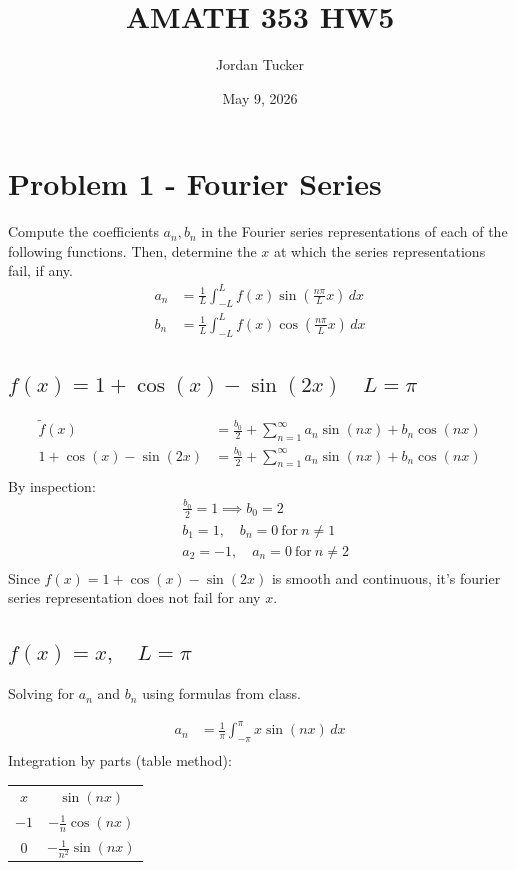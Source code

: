 \documentclass[11pt]{article}
\title{AMATH 353 HW5}
\author{Jordan Tucker}
\date{May 9, 2026}
\begin{document}
    \section*{Problem 1 - Fourier Series}
    Compute the coefficients $a_n,b_n$ in the Fourier series representations of each of the
    following functions.
    Then, determine the $x$ at which the series representations fail, if any.
    \begin{align*}
        a_n &= \frac{1}{L} \int_{-L}^{L} f(x) \sin(\frac{n \pi}{L} x) \,dx \\
        b_n &= \frac{1}{L} \int_{-L}^{L} f(x) \cos(\frac{n \pi}{L} x) \,dx
    \end{align*}

    \subsection{$f(x)=1+\cos(x) - \sin(2x) \quad L = \pi$}
    \begin{align*}
        \tilde f(x) &= \frac{b_0}{2} + \sum_{n=1}^\infty a_n \sin(nx) + b_n \cos(nx)\\
        1+\cos(x) - \sin(2x) &= \frac{b_0}{2} + \sum_{n=1}^\infty a_n \sin(nx) + b_n \cos(nx)\\
    \end{align*}
    By inspection:
    \begin{align*}
        &\frac{b_0}{2} = 1 \implies {b_0 = 2}\\
        &b_1 = 1, \quad b_n = 0 \ \text{for} \ n \neq 1\\
        &a_2 = -1, \quad a_n = 0 \ \text{for} \ n \neq 2\\
    \end{align*}
    Since $f(x)=1+\cos(x) - \sin(2x)$ is smooth and continuous, it's fourier series representation
    does not fail for any $x$.

    \subsection{$f(x)=x, \quad L = \pi$}
    Solving for $a_n$ and $b_n$ using formulas from class.

    \begin{align*}
        a_n &= \frac{1}{\pi} \int_{-\pi}^{\pi} x \sin(nx) \,dx \\
    \end{align*}
    Integration by parts (table method):

    \renewcommand{\arraystretch}{1.5}
    \begin{tabular}{ |c| c| }
        \hline
        $x$ & $\sin(nx)$ \\
        $-1$ & $-\frac{1}{n} \cos(nx)$ \\
        $0$ & $-\frac{1}{n^2} \sin(nx)$ \\
        \hline
    \end{tabular}
\end{document}
